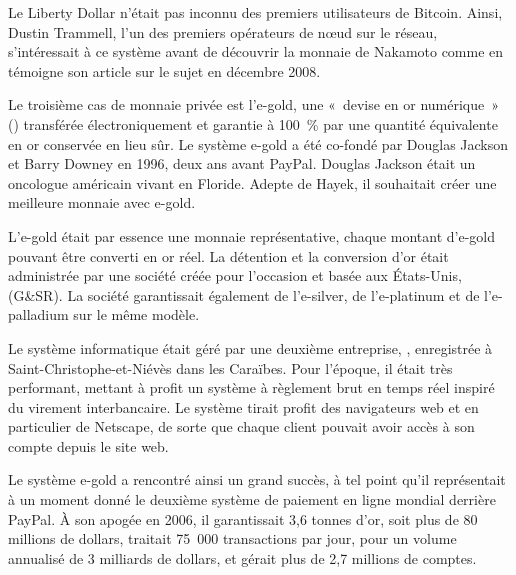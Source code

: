 Le Liberty Dollar n'était pas inconnu des premiers utilisateurs de Bitcoin. Ainsi, Dustin Trammell, l'un des premiers opérateurs de nœud sur le réseau, s'intéressait à ce système avant de découvrir la monnaie de Nakamoto comme en témoigne son article sur le sujet en décembre 2008.


Le troisième cas de monnaie privée est l'e-gold, une «~devise en or numérique~» () transférée électroniquement et garantie à 100~\% par une quantité équivalente en or conservée en lieu sûr. Le système e-gold a été co-fondé par Douglas Jackson et Barry Downey en 1996, deux ans avant PayPal. Douglas Jackson était un oncologue américain vivant en Floride. Adepte de Hayek, il souhaitait créer une meilleure monnaie avec e-gold.


L'e-gold était par essence une monnaie représentative, chaque montant d'e-gold pouvant être converti en or réel. La détention et la conversion d'or était administrée par une société créée pour l'occasion et basée aux États-Unis,  (G\&SR). La société garantissait également de l'e-silver, de l'e-platinum et de l'e-palladium sur le même modèle.

Le système informatique était géré par une deuxième entreprise, , enregistrée à Saint-Christophe-et-Niévès dans les Caraïbes. Pour l'époque, il était très performant, mettant à profit un système à règlement brut en temps réel inspiré du virement interbancaire. Le système tirait profit des navigateurs web et en particulier de Netscape, de sorte que chaque client pouvait avoir accès à son compte depuis le site web.

Le système e-gold a rencontré ainsi un grand succès, à tel point qu'il représentait à un moment donné le deuxième système de paiement en ligne mondial derrière PayPal. À son apogée en 2006, il garantissait 3,6 tonnes d'or, soit plus de 80 millions de dollars, traitait 75~000 transactions par jour, pour un volume annualisé de 3 milliards de dollars, et gérait plus de 2,7 millions de comptes.

